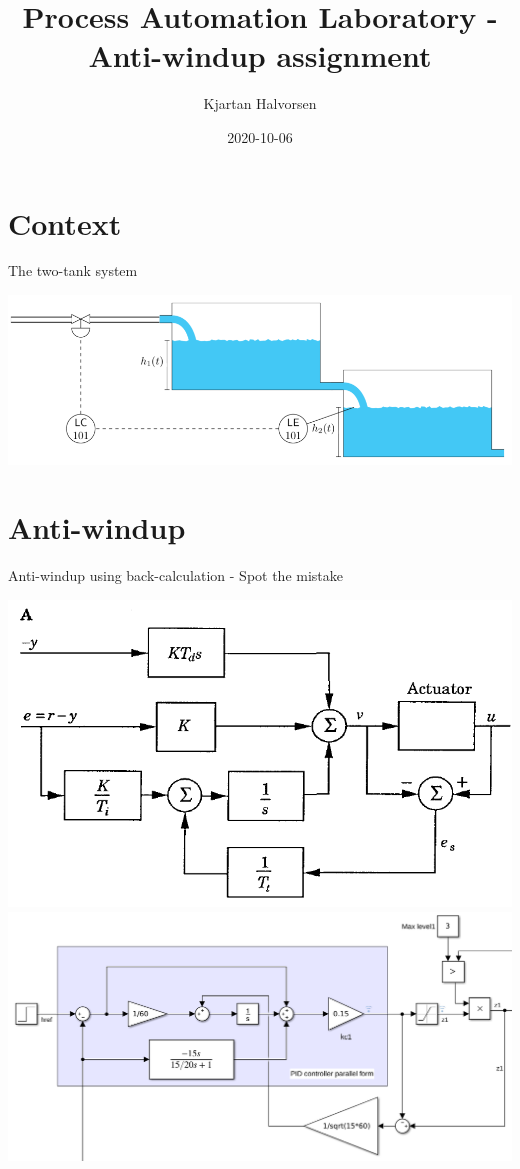 \documentclass[presentation,aspectratio=169, usenames, dvipsnames]{beamer}
\author{Kjartan Halvorsen}
\date{2020-10-06}
\title{Process Automation Laboratory  - Anti-windup assignment}
\begin{document}
\maketitle


\section{Context}
\label{sec:org7348bef}
\begin{frame}[label={sec:orgccface9}]{The two-tank system}
\begin{center}
\includegraphics[width=0.8\linewidth]{../../figures/two-tanks-shutoff-valve.png}
\end{center}
\end{frame}


\section{Anti-windup}
\label{sec:orge5ed4e3}

\begin{frame}[label={sec:org755088d}]{Anti-windup using back-calculation - Spot the mistake}
\begin{center}
\includegraphics[height=0.38\textheight]{../../figures/astrom-back-tracking.png}
\includegraphics[height=0.42\textheight]{../../figures/back-tracking-review.png}
\end{center}
\end{frame}
\end{document}
